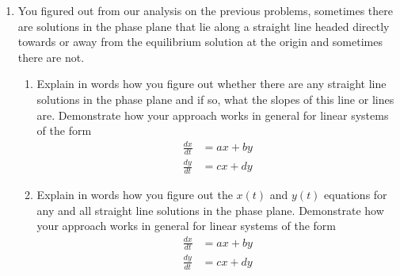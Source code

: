 \begin{enumerate}[resume]
\begin{enumerate}

\clearpage

\item You figured out from our analysis on the previous problems, sometimes there are solutions in the phase plane that lie along a straight line headed directly towards or away from the equilibrium solution at the origin and sometimes there are not. \label{12HWproblem3}

\begin{enumerate}
\item	Explain in words how you figure out whether there are any straight line solutions in the phase plane and if so, what the slopes of this line or lines are. Demonstrate how your approach works in general for linear systems of the form \label{12HWproblem3parta}
\begin{align*}
\frac{dx}{dt}&=ax+by\\
\frac{dy}{dt}&=cx+dy
\end{align*}

\item	Explain in words how you figure out the $x(t)$ and $y(t)$ equations for any and all straight line solutions in the phase plane. Demonstrate how your approach works in general for linear systems of the form \label{12HWproblem3partb} 
\begin{align*}
\frac{dx}{dt}&=ax+by\\
\frac{dy}{dt}&=cx+dy
\end{align*}


\end{enumerate}
\end{enumerate}
\end{enumerate}

